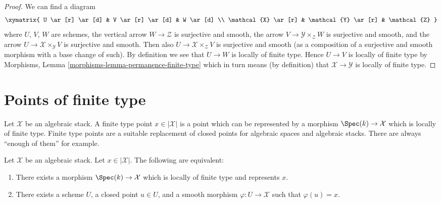 \begin{proof}
We can find a diagram
$$
\xymatrix{
U \ar[r] \ar[d] & V \ar[r] \ar[d] & W \ar[d] \\
\mathcal{X} \ar[r] & \mathcal{Y} \ar[r] & \mathcal{Z}
}
$$
where $U$, $V$, $W$ are schemes, the vertical arrow $W \to \mathcal{Z}$
is surjective and smooth, the arrow $V \to \mathcal{Y} \times_\mathcal{Z} W$
is surjective and smooth, and the arrow
$U \to \mathcal{X} \times_\mathcal{Y} V$ is surjective and smooth.
Then also $U \to \mathcal{X} \times_\mathcal{Z} V$ is surjective and
smooth (as a composition of a surjective and smooth morphism with a
base change of such). By definition we see that $U \to W$ is locally
of finite type. Hence $U \to V$ is locally of finite type by
Morphisms, Lemma \ref{morphisms-lemma-permanence-finite-type}
which in turn means (by definition) that $\mathcal{X} \to \mathcal{Y}$
is locally of finite type.
\end{proof}










\section{Points of finite type}
\label{section-points-finite-type}

\noindent
Let $\mathcal{X}$ be an algebraic stack.
A finite type point $x \in |\mathcal{X}|$ is a point which can be represented
by a morphism $\Spec(k) \to \mathcal{X}$ which is locally of finite type.
Finite type points are a suitable replacement of closed points for algebraic
spaces and algebraic stacks. There are always ``enough of them'' for example.

\begin{lemma}
\label{lemma-point-finite-type}
Let $\mathcal{X}$ be an algebraic stack.
Let $x \in |\mathcal{X}|$. The following are equivalent:
\begin{enumerate}
\item There exists a morphism $\Spec(k) \to \mathcal{X}$
which is locally of finite type and represents $x$.
\item There exists a scheme $U$, a closed point $u \in U$, and a smooth
morphism $\varphi : U \to \mathcal{X}$ such that $\varphi(u) = x$.
\end{enumerate}
\end{lemma}

